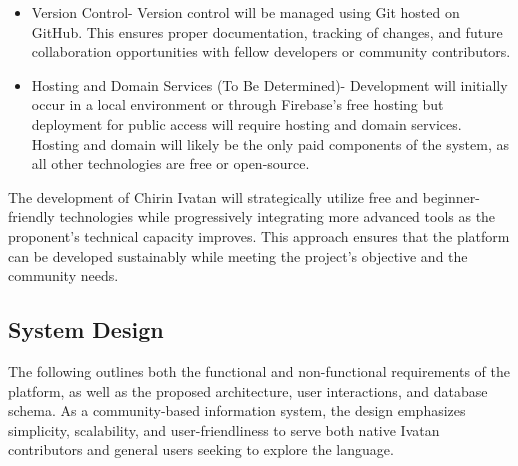 \begin{itemize}
                \item Version Control- Version control will be managed using Git hosted on GitHub. This ensures proper documentation, tracking of changes, and future collaboration opportunities with fellow developers or community contributors. 
                \item Hosting and Domain Services (To Be Determined)- Development will initially occur in a local environment or through Firebase’s free hosting but deployment for public access will require hosting and domain services. Hosting and domain will likely be the only paid components of the system, as all other technologies are free or open-source.
            \end{itemize}
        The development of Chirin Ivatan will strategically utilize free and beginner-friendly technologies while progressively integrating more advanced tools as the proponent’s technical capacity improves. This approach ensures that the platform can be developed sustainably while meeting the project’s objective and the community needs.


        
        \subsection{System Design}
        The following outlines both the functional and non-functional requirements of the platform, as well as the proposed architecture, user interactions, and database schema. As a community-based information system, the design emphasizes simplicity, scalability, and user-friendliness to serve both native Ivatan contributors and general users seeking to explore the language.
